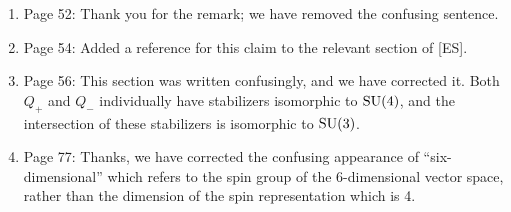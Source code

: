 \documentclass[10pt, oneside]{article}
\begin{document}
\begin{enumerate}
 \item Page 52: Thank you for the remark; we have removed the confusing sentence.
 \item Page 54: Added a reference for this claim to the relevant section of [ES].
 \item Page 56: This section was written confusingly, and we have corrected it.  Both $Q_+$ and $Q_-$ individually have stabilizers isomorphic to $\mathrm{SU}(4)$, and the intersection of these stabilizers is isomorphic to $\mathrm{SU}(3)$.
 \item Page 77: Thanks, we have corrected the confusing appearance of ``six-dimensional'' which refers to the spin group of the 6-dimensional vector space, rather than the dimension of the spin representation which is 4.
\end{enumerate}

 
\end{document}

